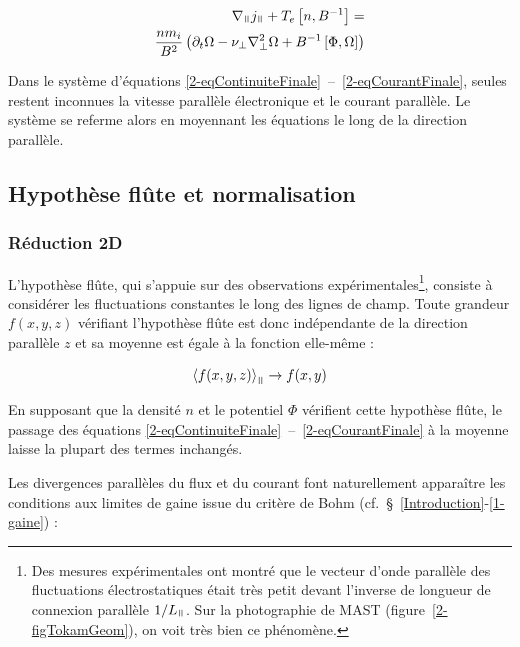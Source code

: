 \begin{refsection}
\begin{equation}\begin{split}
\label{2-eqCourantFinale}
\nabla_\para{j}_\para +
T_e\left[n,B\puissance{-1}\right] =\\
\frac{nm_i}{B^2}\left(\partial_{t}\Omega - \nu_\perp
\nabla_\perp^2\Omega+
B\puissance{-1}\left[\Phi,\Omega\right]\right)
\end{split}
\end{equation} 

 Dans le système d'équations
 \eqref{2-eqContinuiteFinale}~--~\eqref{2-eqCourantFinale}, seules restent
 inconnues la vitesse parallèle électronique  et le courant parallèle. Le
 système se referme alors en moyennant les équations le long de la
 direction parallèle. 

\subsection{Hypothèse flûte et normalisation}
\label{2-flute}
\subsubsection{Réduction 2D}

 L'hypothèse flûte, qui s'appuie sur des observations
expérimentales\footnote{Des mesures expérimentales ont montré que le vecteur
d'onde parallèle des fluctuations électrostatiques était très petit devant
l'inverse de longueur de connexion parallèle $1/L_\para$\parencite{Wootton}.
Sur la photographie de MAST
(figure~\ref{2-figTokamGeom}), on voit très bien ce phénomène.}, consiste à
considérer les fluctuations constantes le long des lignes de champ. Toute grandeur $f(x,y,z)$ vérifiant l'hypothèse flûte est donc indépendante de la direction parallèle $z$ et sa moyenne est égale à la fonction elle-même :

\begin{equation}
\left<f(x,y,z)\right>_\para\rightarrow f(x,y)
\end{equation}

En supposant que la densité $n$ et le potentiel $\Phi$ vérifient cette hypothèse
flûte, le passage des équations
\eqref{2-eqContinuiteFinale}~--~\eqref{2-eqCourantFinale} à la moyenne laisse la plupart des termes inchangés.

Les divergences parallèles du flux et du
courant font naturellement apparaître
les conditions aux limites de gaine issue du critère de Bohm
(cf.~\S~\ref{Introduction}-\ref{1-gaine}) :


\end{refsection}
